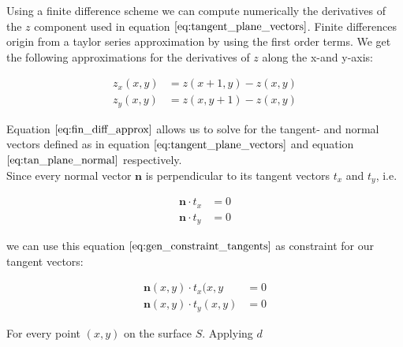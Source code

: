\documentclass{paper}
\begin{document}
Using a finite difference scheme we can compute numerically the derivatives of the $z$ component used in equation $\ref{eq:tangent_plane_vectors}$. Finite differences origin from a taylor series approximation by using the first order terms. We get the following approximations for the derivatives of $z$ along the x-and y-axis:

\begin{align}
    z_x(x,y) &= z(x+1,y) - z(x,y) \nonumber \\
    z_y(x,y) &= z(x,y+1) - z(x,y)
\label{eq:fin_diff_approx}
\end{align}

Equation $\ref{eq:fin_diff_approx}$ allows us to solve for the tangent- and normal vectors defined as in equation $\ref{eq:tangent_plane_vectors}$ and equation $\ref{eq:tan_plane_normal}$ respectively. \\

Since every normal vector $\textbf{n}$ is perpendicular to its tangent vectors $t_x$ and $t_y$, i.e.

\begin{align}
    \textbf{n} \cdot t_x &= 0 \nonumber \\
    \textbf{n} \cdot t_y &= 0
\label{eq:gen_constraint_tangents}
\end{align}

we can use this equation $\ref{eq:gen_constraint_tangents}$ as constraint for our tangent vectors:

\begin{align}
    \textbf{n}(x,y) \cdot t_x(x,y &= 0 \nonumber \\
    \textbf{n}(x,y) \cdot t_y(x,y) &= 0
\label{eq:gen_constraint_tangents}
\end{align}

For every point $(x,y)$ on the surface $S$. Applying $d$
\end{document}
